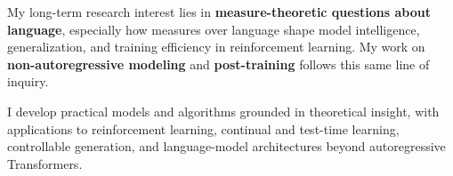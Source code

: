 
\begin{cvparagraph}
My long-term research interest lies in \textbf{measure-theoretic questions about language}, especially how measures over language shape model intelligence, generalization, and training efficiency in reinforcement learning. My work on \textbf{non-autoregressive modeling} and \textbf{post-training} follows this same line of inquiry.

I develop practical models and algorithms grounded in theoretical insight, with applications to reinforcement learning, continual and test-time learning, controllable generation, and language-model architectures beyond autoregressive Transformers.
\end{cvparagraph}
